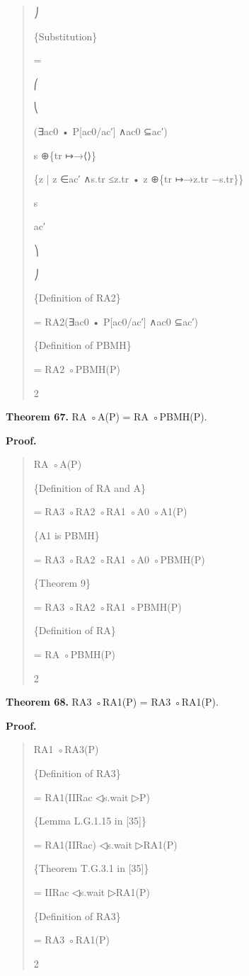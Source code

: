 \documentclass[11pt]{article}
\begin{document}
\begin{quote}\small\raggedright
⎠
\par
\{Substitution\}
\par
=
\par
⎛
\par
⎝
\par
(∃ac0 • P[ac0/ac′] ∧ac0 ⊆ac′)
\par
s ⊕\{tr ↦→⟨⟩\}
\par
\{z | z ∈ac′ ∧s.tr ≤z.tr • z ⊕\{tr ↦→z.tr −s.tr\}\}
\par
s
\par
ac′
\par
⎞
\par
⎠
\par
\{Definition of RA2\}
\par
= RA2(∃ac0 • P[ac0/ac′] ∧ac0 ⊆ac′)
\par
\{Definition of PBMH\}
\par
= RA2 ◦PBMH(P)
\par
2
\end{quote}

\noindent\textbf{Theorem 67.} RA ◦A(P) = RA ◦PBMH(P).


\noindent\textbf{Proof.}


\begin{quote}\small\raggedright
RA ◦A(P)
\par
\{Definition of RA and A\}
\par
= RA3 ◦RA2 ◦RA1 ◦A0 ◦A1(P)
\par
\{A1 is PBMH\}
\par
= RA3 ◦RA2 ◦RA1 ◦A0 ◦PBMH(P)
\par
\{Theorem 9\}
\par
= RA3 ◦RA2 ◦RA1 ◦PBMH(P)
\par
\{Definition of RA\}
\par
= RA ◦PBMH(P)
\par
2
\end{quote}

\noindent\textbf{Theorem 68.} RA3 ◦RA1(P) = RA3 ◦RA1(P).


\noindent\textbf{Proof.}


\begin{quote}\small\raggedright
RA1 ◦RA3(P)
\par
\{Definition of RA3\}
\par
= RA1(IIRac ◁s.wait ▷P)
\par
\{Lemma L.G.1.15 in [35]\}
\par
= RA1(IIRac) ◁s.wait ▷RA1(P)
\par
\{Theorem T.G.3.1 in [35]\}
\par
= IIRac ◁s.wait ▷RA1(P)
\par
\{Definition of RA3\}
\par
= RA3 ◦RA1(P)
\par
2
\end{quote}
\end{document}

